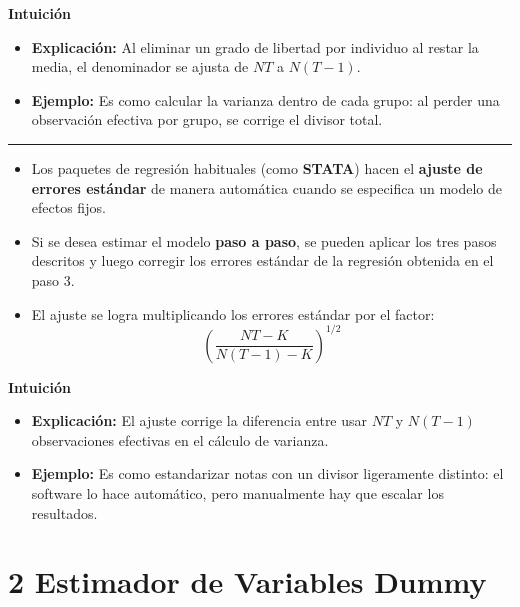 \documentclass[12pt]{article}
\begin{document}
\noindent\textbf{Intuición}
\begin{itemize}
    \item \textbf{Explicación:} Al eliminar un grado de libertad por individuo al restar la media, el denominador se ajusta de $NT$ a $N(T-1)$.
    \item \textbf{Ejemplo:} Es como calcular la varianza dentro de cada grupo: al perder una observación efectiva por grupo, se corrige el divisor total.
\end{itemize}

\hrule

\begin{itemize}
    \item Los paquetes de regresión habituales (como \textbf{STATA}) hacen el \textbf{ajuste de errores estándar} de manera automática cuando se especifica un modelo de efectos fijos.
    
    \item Si se desea estimar el modelo \textbf{paso a paso}, se pueden aplicar los tres pasos descritos y luego corregir los errores estándar de la regresión obtenida en el paso 3.
    
    \item El ajuste se logra multiplicando los errores estándar por el factor:
    \[
    \left(\frac{NT - K}{N(T-1) - K}\right)^{1/2}
    \]
\end{itemize}

\noindent\textbf{Intuición}
\begin{itemize}
    \item \textbf{Explicación:} El ajuste corrige la diferencia entre usar $NT$ y $N(T-1)$ observaciones efectivas en el cálculo de varianza.
    \item \textbf{Ejemplo:} Es como estandarizar notas con un divisor ligeramente distinto: el software lo hace automático, pero manualmente hay que escalar los resultados.
\end{itemize}

\section*{\noindent\textbf{2 Estimador de Variables Dummy}}
\end{document}
